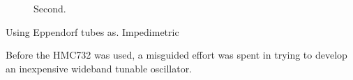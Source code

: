 \documentclass[paper.tex]{subfiles}
\begin{document}
\begin{figure}[H]
	\centering

	\caption{Second.}
	\hfill
	
\end{figure}


Using Eppendorf tubes as. Impedimetric 

Before the HMC732 was used, a misguided effort was spent in trying to develop an inexpensive wideband tunable oscillator. 
\end{document}

